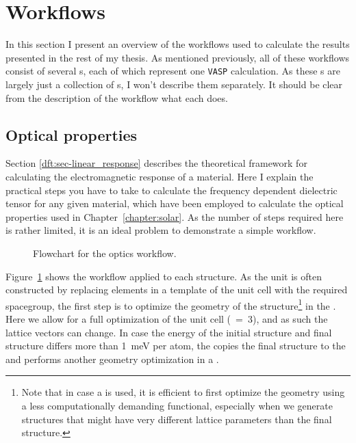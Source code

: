 \begin{refsection}
\begin{itemize}
\end{itemize}

\section{Workflows} \label{automation:sec-workflows}

In this section I present an overview of the workflows used to calculate the results presented in the rest of my thesis. As mentioned previously, all of these workflows consist of several s, each of which represent one \texttt{VASP} calculation. As these s are largely just a collection of s, I won't describe them separately. It should be clear from the description of the workflow what each  does.

\subsection{Optical properties} \label{automation:sec-optics}

Section \ref{dft:sec-linear_response} describes the theoretical framework for calculating the electromagnetic response of a material. Here I explain the practical steps you have to take to calculate the frequency dependent dielectric tensor for any given material, which have been employed to calculate the optical properties used in Chapter~\ref{chapter:solar}. As the number of steps required here is rather limited, it is an ideal problem to demonstrate a simple workflow.

\begin{figure}[ht]

\caption{\label{automation:fig-optics} Flowchart for the optics workflow.}
\end{figure}

Figure~\ref{automation:fig-optics} shows the workflow applied to each structure. As the unit is often constructed by replacing elements in a template of the unit cell with the required spacegroup, the first step is to optimize the geometry of the structure\footnote{Note that in case a  is used, it is efficient to first optimize the geometry using a less computationally demanding functional, especially when we generate structures that might have very different lattice parameters than the final structure.} in the . Here we allow for a full optimization of the unit cell (~=~3), and as such the lattice vectors can change. In case the energy of the initial structure and final structure differs more than 1~\si{\milli\electronvolt} per atom, the  copies the final structure  to the  and performs another geometry optimization in a .


\end{refsection}
